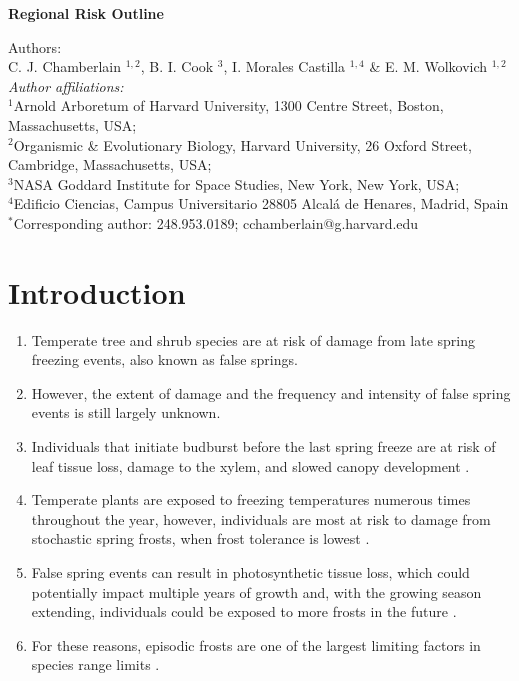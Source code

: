 \documentclass{article}\usepackage[]{graphicx}\usepackage[]{color}
\begin{document}
\noindent \textbf{\Large{Regional Risk Outline}}

\noindent Authors:\\
C. J. Chamberlain $^{1,2}$, B. I. Cook $^{3}$, I. Morales Castilla $^{1,4}$ \& E. M. Wolkovich $^{1,2}$
\vspace{2ex}\\
\emph{Author affiliations:}\\
$^{1}$Arnold Arboretum of Harvard University, 1300 Centre Street, Boston, Massachusetts, USA; \\
$^{2}$Organismic \& Evolutionary Biology, Harvard University, 26 Oxford Street, Cambridge, Massachusetts, USA; \\
$^{3}$NASA Goddard Institute for Space Studies, New York, New York, USA; \\
$^{4}$Edificio Ciencias, Campus Universitario 28805 Alcalá de Henares, Madrid, Spain \\
\vspace{2ex}
$^*$Corresponding author: 248.953.0189; cchamberlain@g.harvard.edu\\

\renewcommand{\thetable}{\arabic{table}}
\renewcommand{\thefigure}{\arabic{figure}}
\renewcommand{\labelitemi}{$-$}





\section{Introduction}
\begin{enumerate}
\item Temperate tree and shrub species are at risk of damage from late spring freezing events, also known as false springs.
\item However, the extent of damage and the frequency and intensity of false spring events is still largely unknown.
\item Individuals that initiate budburst before the last spring freeze are at risk of leaf tissue loss, damage to the xylem, and slowed canopy development \citep{Gu2008, Hufkens2012}.
\item Temperate plants are exposed to freezing temperatures numerous times throughout the year, however, individuals are most at risk to damage from stochastic spring frosts, when frost tolerance is lowest \citep{Sakai1987}.
\item False spring events can result in photosynthetic tissue loss, which could potentially impact multiple years of growth and, with the growing season extending, individuals could be exposed to more frosts in the future \citep{Liu2018}.
\item For these reasons, episodic frosts are one of the largest limiting factors in species range limits \citep{Kollas2014}. 
\end{enumerate}
\end{document}
